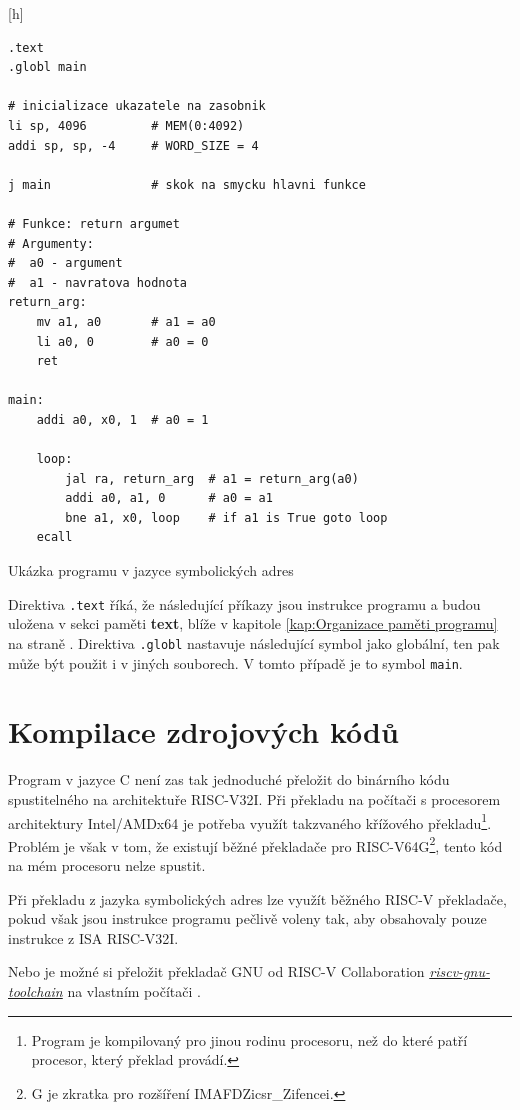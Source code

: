 \documentclass[FM,BP]{tulthesis}
\newenvironment{myquote}{\begin{list}{}{\setlength\leftmargin\parindent}\item[]}{\end{list}}
\newenvironment{listing}{\begin{myquote}\color{\tulcolor}}{\end{myquote}}
\begin{document}
\begin{listing}[h]
    \begin{verbatim}
.text
.globl main

# inicializace ukazatele na zasobnik
li sp, 4096         # MEM(0:4092)
addi sp, sp, -4     # WORD_SIZE = 4

j main              # skok na smycku hlavni funkce

# Funkce: return argumet
# Argumenty:
#  a0 - argument
#  a1 - navratova hodnota
return_arg:
    mv a1, a0       # a1 = a0
    li a0, 0        # a0 = 0
    ret

main:
    addi a0, x0, 1  # a0 = 1

    loop:
        jal ra, return_arg  # a1 = return_arg(a0)
        addi a0, a1, 0      # a0 = a1
        bne a1, x0, loop    # if a1 is True goto loop
    ecall
    \end{verbatim}
    \caption{Ukázka programu v jazyce symbolických adres}
    \label{listing:asm_program}
\end{listing}

Direktiva \verb|.text| říká, že následující příkazy jsou instrukce programu a budou uložena v sekci paměti \textbf{text}, blíže v kapitole \ref{kap:Organizace paměti programu} na straně \pageref{kap:Organizace paměti programu}. Direktiva \verb|.globl| nastavuje následující symbol jako globální, ten pak může být použit i v jiných souborech. V tomto případě je to symbol \verb|main|.

\section{Kompilace zdrojových kódů}
Program v jazyce C není zas tak jednoduché přeložit do binárního kódu spustitelného na architektuře RISC-V32I. Při překladu na počítači s procesorem architektury Intel/AMDx64 je potřeba využít takzvaného křížového překladu\footnote{Program je kompilovaný pro jinou rodinu procesoru, než do které patří procesor, který překlad provádí.}. Problém je však v tom, že existují běžné překladače pro RISC-V64G\footnote{G je zkratka pro rozšíření IMAFDZicsr\_Zifencei.}, tento kód na mém procesoru nelze spustit. 

Při překladu z jazyka symbolických adres lze využít běžného RISC-V překladače, pokud však jsou instrukce programu pečlivě voleny tak, aby obsahovaly pouze instrukce z ISA RISC-V32I.

Nebo je možné si přeložit překladač GNU od RISC-V Collaboration  \href{https://github.com/riscv-collab/riscv-gnu-toolchain}{\emph{riscv-gnu-toolchain}} na vlastním počítači \cite{github_GNU_compiler}.
\end{document}
